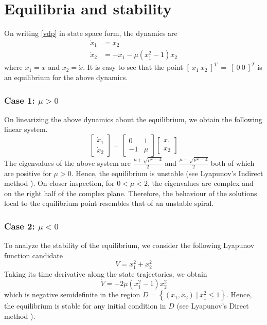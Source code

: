 \documentclass[11pt]{article}
\begin{document}
\section{Equilibria and stability}
On writing \eqref{vdp} in state space form, the dynamics are 
\begin{align}\label{ss}
\dot{x}_1&=x_2 \nonumber \\
\dot{x}_2&=-x_1-\mu(x^2_1-1)x_2
\end{align}
where $x_1=x$ and $x_2=\dot{x}$. It is easy to see that the point $[\ x_1\ x_2\ ]^T\ =\ [\ 0\ 0\ ]^T$ is an equilibrium for the above dynamics. 
\subsubsection*{Case 1: $\mu >0$}
On linearizing the above dynamics about the equilibrium, we obtain the following linear system.
\begin{equation}
\begin{bmatrix}\dot{x}_1\\\dot{x}_2\end{bmatrix}=\begin{bmatrix} 0 & 1 \\-1 & \mu\end{bmatrix}\begin{bmatrix}x_1\\x_2\end{bmatrix}
 \end{equation}
 The eigenvalues of the above system are $\frac{\mu+\sqrt{\mu^2-4}}{2}$ and $\frac{\mu-\sqrt{\mu^2-4}}{2}$ both of which are positive for $\mu >0$. Hence, the  equilibrium is unstable (see Lyapunov's Indirect method \cite{slotine}). On closer inspection, for $0<\mu<2$, the eigenvalues are complex and on the right half of the complex plane. Therefore, the behaviour of the solutions local to the equilibrium point resembles that of an unstable spiral.
\subsubsection*{Case 2: $\mu<0$}
To analyze the stability of the equilibrium, we consider the following Lyapunov function candidate $$V = x^2_1 +x^2_2 $$
Taking its time derivative along the state trajectories, we obtain $$\dot{V}=-2\mu(x^2_1-1)x^2_2$$ which is negative semidefinite in the region $D=\left\{(x_1,x_2)\ |\  x^2_1 \leq 1\right\}$. Hence, the equilibrium is stable for any initial condition in $D$ (see Lyapunov's Direct method \cite{slotine}).
\end{document}
